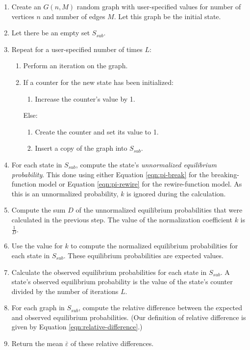 \documentclass[a4paper,10pt]{article}
\begin{document}
\begin{enumerate}
 \item Create an $G(n, M)$ random graph with user-specified values for number of vertices $n$ and number of edges $M$. Let this graph be the initial state.
 \item Let there be an empty set $S_{sub}$.
 \item Repeat for a user-specified number of times $L$: 
  \begin{enumerate}
   \item Perform an iteration on the graph.
   \item If a counter for the new state has been initialized:
      \begin{enumerate} 
       \item Increase the counter's value by 1.
      \end{enumerate} 
      Else:
      \begin{enumerate}
       \item Create the counter and set its value to 1.
       \item Insert a copy of the graph into $S_{sub}$.
      \end{enumerate}
  \end{enumerate}
 \item For each state in $S_{sub}$, compute the state's \emph{unnormalized equilibrium probability}. This done using either Equation \ref{eqn:pi-break} for the breaking-function model or Equation \ref{eqn:pi-rewire} for the rewire-function model. As this is an unnormalized probability, $k$ is ignored during the calculation.
 \item \label{item:calculate-k} Compute the sum $D$ of the unnormalized equilibrium probabilities that were calculated in the previous step. The value of the normalization coefficient $k$ is $\frac{1}{D}$.
 \item Use the value for $k$ to compute the normalized equilibrium probabilities for each state in $S_{sub}$. These equilibrium probabilities are expected values.
 \item Calculate the observed equilibrium probabilities for each state in $S_{sub}$. A state's observed equilibrium probability is the value of the state's counter divided by the number of iterations $L$.
 \item For each graph in $S_{sub}$, compute the relative difference between the expected and observed equilibrium probabilities. (Our definition of relative difference is given by Equation \ref{eqn:relative-difference}.)
 \item Return the mean $\overline\varepsilon$ of these relative differences.
\end{enumerate}
\end{document}
